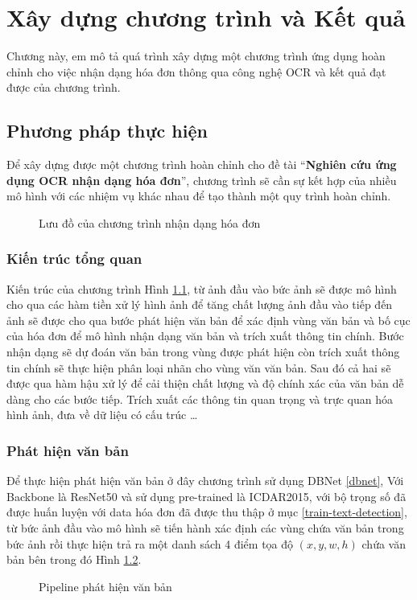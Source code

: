 \chapter{Xây dựng chương trình và Kết quả} \label{build_and_result}

Chương này, em mô tả quá trình xây dựng một chương trình ứng dụng hoàn chỉnh cho việc nhận dạng hóa đơn thông qua công nghệ OCR và kết quả đạt được của chương trình.
\section{Phương pháp thực hiện}
Để xây dựng được một chương trình hoàn chỉnh cho đề tài ``\textbf{Nghiên cứu ứng dụng OCR nhận dạng hóa đơn}'', chương trình sẽ cần sự kết hợp của nhiều mô hình với các nhiệm vụ khác nhau để tạo thành một quy trình hoàn chỉnh. 

\begin{figure}
    
    \centering
    \caption{Lưu đồ của chương trình nhận dạng hóa đơn}
    \label{pipeline}
\end{figure}

\subsection{Kiến trúc tổng quan}
Kiến trúc của chương trình Hình \ref{pipeline}, từ ảnh đầu vào bức ảnh sẽ được mô hình cho qua các hàm tiền xử lý hình ảnh để tăng chất lượng ảnh đầu vào tiếp đến ảnh sẽ được cho qua bước phát hiện văn bản để xác định vùng văn bản và bố cục của hóa đơn để mô hình nhận dạng văn bản và trích xuất thông tin chính. Bước nhận dạng sẽ dự đoán văn bản trong vùng được phát hiện còn trích xuất thông tin chính sẽ thực hiện phân loại nhãn cho vùng văn văn bản. Sau đó cả hai sẽ được qua hàm hậu xử lý để cải thiện chất lượng và độ chính xác của văn bản dễ dàng cho các bước tiếp. Trích xuất các thông tin quan trọng và trực quan hóa hình ảnh, đưa về dữ liệu có cấu trúc \ldots

\subsection{Phát hiện văn bản}
Để thực hiện phát hiện văn bản ở đây chương trình sử dụng DBNet \ref{dbnet}, Với Backbone là ResNet50 và sử dụng pre-trained là ICDAR2015, với bộ trọng số đã được huấn luyện với data hóa đơn đã được thu thập ở mục \ref{train-text-detection}, từ bức ảnh đầu vào mô hình sẽ tiến hành xác định các vùng chứa văn bản trong bức ảnh rồi thực hiện trả ra một danh sách 4 điểm tọa độ $(x, y, w, h)$ chứa văn bản bên trong đó Hình \ref{pipeline-text-detection}. 
\begin{figure}[h]
    
    \centering
    \caption{Pipeline phát hiện văn bản}
    \label{pipeline-text-detection}
\end{figure}

